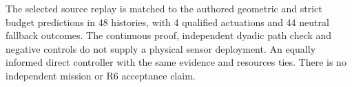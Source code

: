 \documentclass[11pt]{article}
\begin{document}
The selected source replay is matched to the authored geometric
and strict budget predictions in 48 histories, with 4 qualified
actuations and 44 neutral fallback outcomes. The continuous
proof, independent dyadic path check and negative controls
do not supply a physical sensor deployment. An equally
informed direct controller with the same evidence and resources
ties. There is no independent mission or R6 acceptance claim.
\end{document}
